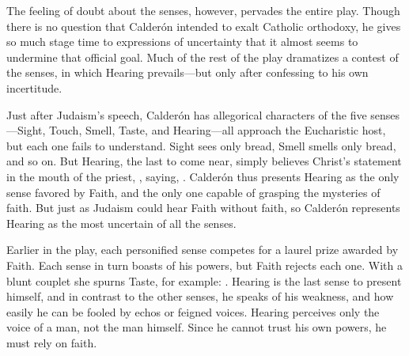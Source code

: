 The feeling of doubt about the senses, however, pervades the entire play.
Though there is no question that Calderón intended to exalt Catholic orthodoxy, he gives so much stage time to expressions of uncertainty that it almost seems to undermine that official goal.
Much of the rest of the play dramatizes a contest of the senses, in which Hearing prevails---but only after confessing to his own incertitude.

Just after Judaism's speech, Calderón has allegorical characters of the five senses---Sight, Touch, Smell, Taste, and Hearing---all approach the Eucharistic host, but each one fails to understand.
Sight sees only bread, Smell smells only bread, and so on.
But Hearing, the last to come near, simply believes Christ's statement in the mouth of the priest, , saying, .%
  \autocite[: ]{Calderon:Retiro}
Calderón thus presents Hearing as the only sense favored by Faith, and the only one capable of grasping the mysteries of faith.
But just as Judaism could hear Faith without faith, so Calderón represents Hearing as the most uncertain of all the senses.

Earlier in the play, each personified sense competes for a laurel prize awarded by Faith.
Each sense in turn boasts of his powers, but Faith rejects each one.
With a blunt couplet she spurns Taste, for example: .%
  \autocite[]{Calderon:Retiro}
Hearing is the last sense to present himself, and in contrast to the other senses, he speaks of his weakness, and how easily he can be fooled by echos or feigned voices.
Hearing perceives only the voice of a man, not the man himself.
Since he cannot trust his own powers, he must rely on faith.


